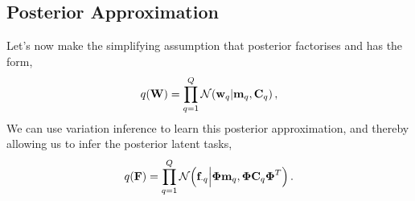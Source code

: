 \subsection{Posterior Approximation}
 Let's now make the simplifying assumption that posterior factorises and has the
form,
\begin{equation}
    q\!\left({\mathbf{W}}\right) = \prod^Q_{q=1} \mathcal{N}\!\left({\mathbf{w}_q}\middle\vert{\ensuremath{\mathbf{m}}_q, \ensuremath{\mathbf{C}}_q}\right),
\end{equation}
We can use variation inference to learn this posterior approximation, and
thereby allowing us to infer the posterior latent tasks,
\begin{equation}
\label{eq:posteriorF}
q\!\left({\mathbf{F}}\right)  = \prod^Q_{q=1} \mathcal{N}\!\left({\mathbf{f}_{\cdot q}}\middle\vert{\ensuremath{\boldsymbol\Phi}\ensuremath{\mathbf{m}}_q, \ensuremath{\boldsymbol\Phi}\ensuremath{\mathbf{C}}_q  \ensuremath{\boldsymbol\Phi}^T}\right) \text{.}
\end{equation}
